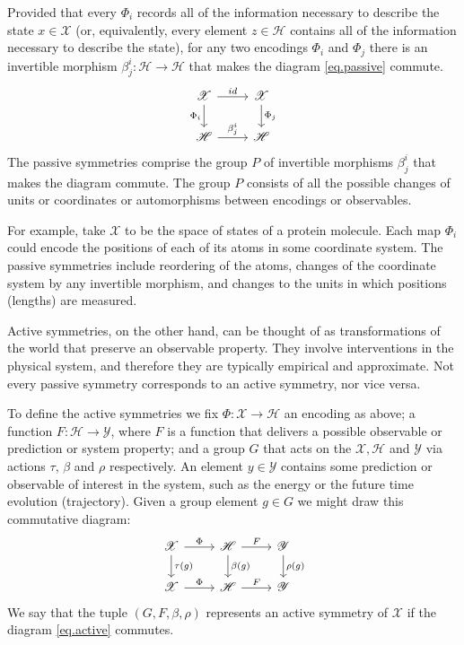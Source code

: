 \documentclass[accepted]{article}
\renewcommand{\mathcal}[1]{\mathscr{#1}} %
\begin{document}
Provided that every $\Phi_i$ records all of the information necessary to describe the state $x\in \mathcal{X}$ (or, equivalently, every element $z\in \mathcal{H}$ contains all of the information necessary to describe the state),
for any two encodings $\Phi_i$ and $\Phi_j$ there is an invertible morphism $\beta_j^i:\mathcal{H}\to\mathcal{H}$ that makes the diagram \eqref{eq.passive} commute.
\begin{equation}\label{eq.passive}
\begin{tikzcd}[every label/.append ]
  {\mathcal{X}}\arrow[r, "id"] \arrow[d,"\Phi_i",swap] & {\mathcal{X}}  \arrow[d,"\Phi_j"]\\
{\mathcal{H}} \arrow[r, "\beta_j^i"]  & {\mathcal{H}} 
\end{tikzcd}
\end{equation}
The passive symmetries comprise the group $P$ of invertible morphisms $\beta_j^i$ that makes the diagram commute.
The group $P$ consists of all the possible changes of units or coordinates or automorphisms between encodings or observables. 

For example, take $\mathcal{X}$ to be the space of states of a protein molecule.
Each map $\Phi_i$ could encode the positions of each of its atoms in some coordinate system.
The passive symmetries include reordering of the atoms, changes of the coordinate system by any invertible morphism, and changes to the units in which positions (lengths) are measured.

Active symmetries, on the other hand, can be thought of as transformations of the world that preserve an observable property.
They involve interventions in the physical system, and therefore they are typically empirical and approximate.
Not every passive symmetry corresponds to an active symmetry, nor vice versa.

To define the active symmetries we fix $\Phi:\mathcal X \to \mathcal{H}$ an encoding as above; a function $F: \mathcal H \to \mathcal Y$, where $F$ is a function that delivers a possible observable or prediction or system property; and a group $G$ that acts on the $\mathcal X, \mathcal H$ and $\mathcal Y$ via actions $\tau$, $\beta$ and $\rho$ respectively.
An element $y\in\mathcal{Y}$ contains some prediction or observable of interest in the system, such as the energy or the future time evolution (trajectory).
Given a group element $g\in G$ we might draw this commutative diagram:
\begin{equation}\label{eq.active}
\begin{tikzcd}[every label/.append]
  {\mathcal X}\arrow[r,"\Phi"] \arrow[d,"\tau(g)"] 
  & 
  {\mathcal H}  \arrow[d,"\beta(g)"] \arrow[r,"F"]
  & 
  {\mathcal Y}  \arrow[d,"\rho(g)"]
  \\
{\mathcal X} \arrow[r,"\Phi"]  
& 
{\mathcal H} \arrow[r,"F"]
&
{\mathcal Y} 
\end{tikzcd}
\end{equation}
We say that the tuple $(G, F, \beta, \rho)$ represents an active symmetry of $\mathcal X$ if the diagram \eqref{eq.active} commutes.
\end{document}
